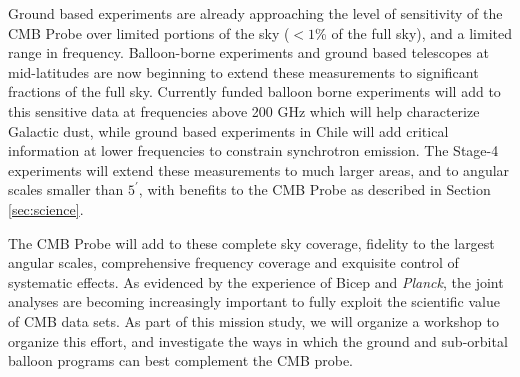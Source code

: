 
Ground based experiments are already approaching the level of
sensitivity of the CMB Probe over limited portions of the sky ($<1$\%
of the full sky), and a limited range in frequency.
Balloon-borne experiments and ground based telescopes at
mid-latitudes are now beginning to extend these measurements to
significant fractions of the full sky. 
Currently funded balloon borne
experiments will add to this sensitive data at frequencies above 200
GHz which will help characterize Galactic dust, while ground based
experiments in Chile will add critical information at lower
frequencies to constrain synchrotron emission.
The Stage-4 experiments
will extend these measurements to much larger areas, and to angular
scales smaller than $5^\prime$, with benefits to the CMB Probe as
described in Section \ref{sec:science}.

The CMB Probe will add to these complete sky coverage, fidelity to the
largest angular scales, comprehensive frequency coverage and exquisite
control of systematic effects.  As evidenced by the experience of
Bicep and {\it Planck}, the joint analyses are becoming increasingly
important to fully exploit the scientific value of CMB data sets.  As
part of this mission study, we will organize a workshop to organize
this effort, and investigate the ways in which the ground and
sub-orbital balloon programs can best complement the CMB probe.


